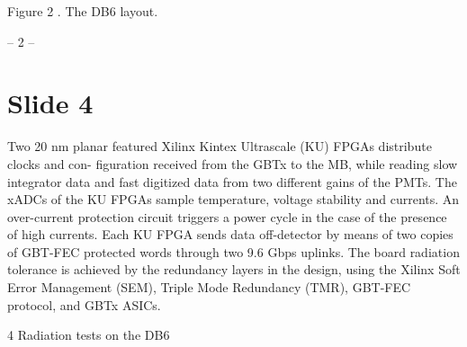 \documentclass{article}
\begin{document}
Figure 2 .   The DB6 layout.

-- 2 --

\section*{Slide 4}

Two 20 nm planar featured Xilinx Kintex Ultrascale (KU) FPGAs distribute clocks and con- 
figuration received from the GBTx to the MB, while reading slow integrator data and fast digitized 
data   from   two   different   gains   of   the   PMTs.   The   xADCs   of   the   KU   FPGAs   sample   temperature, 
voltage stability and currents.   An over-current protection circuit triggers a power cycle in the case 
of the presence of high currents.   Each KU FPGA sends data off-detector by means of two copies of 
GBT-FEC protected words through two 9.6 Gbps uplinks.   The board radiation tolerance is achieved 
by   the   redundancy   layers   in   the   design,   using   the   Xilinx   Soft   Error   Management   (SEM),   Triple 
Mode Redundancy (TMR), GBT-FEC protocol, and GBTx ASICs.

4 
Radiation tests on the DB6
\end{document}
